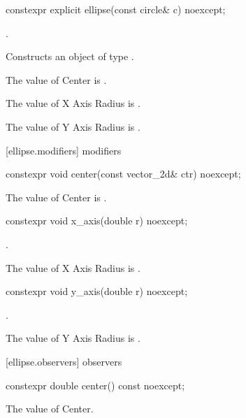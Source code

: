 \begin{itemdecl}
constexpr explicit ellipse(const circle& c) noexcept;
\end{itemdecl}
\begin{itemdescr}
\pnum
\requires
{}.

\pnum
\effects
Constructs an object of type .

\pnum
The value of Center is .

\pnum
The value of X Axis Radius is .

\pnum
The value of Y Axis Radius is .
\end{itemdescr}

 [ellipse.modifiers]{ modifiers}

\begin{itemdecl}
constexpr void center(const vector_2d& ctr) noexcept;
\end{itemdecl}

\begin{itemdescr}
\pnum
\effects
The value of Center is .
\end{itemdescr}

\begin{itemdecl}
constexpr void x_axis(double r) noexcept;
\end{itemdecl}
\begin{itemdescr}
\requires
{}.

\pnum
\effects
The value of X Axis Radius is .
\end{itemdescr}

\begin{itemdecl}
constexpr void y_axis(double r) noexcept;
\end{itemdecl}
\begin{itemdescr}
\requires
{}.

\pnum
\effects
The value of Y Axis Radius is .
\end{itemdescr}

 [ellipse.observers]{ observers}

\begin{itemdecl}
constexpr double center() const noexcept;
\end{itemdecl}
\begin{itemdescr}
\pnum
\returns
The value of Center.
\end{itemdescr}

